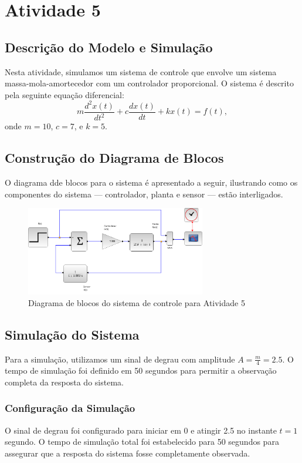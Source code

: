\section{Atividade 5}

\subsection{Descrição do Modelo e Simulação}
Nesta atividade, simulamos um sistema de controle que envolve um sistema massa-mola-amortecedor com um controlador proporcional. O sistema é descrito pela seguinte equação diferencial:
\[
    m\frac{d^2x(t)}{dt^2} + c\frac{dx(t)}{dt} + kx(t) = f(t),
\]
onde \( m = 10 \), \( c = 7 \), e \( k = 5 \).

\subsection{Construção do Diagrama de Blocos}
O diagrama dde blocos para o sistema é apresentado a seguir, ilustrando como os componentes do sistema — controlador, planta e sensor — estão interligados.

\begin{figure}[H]
    \centering
    \includegraphics[width=0.7\textwidth]{atividades/5-atividade/assets/diagrama-a.png}
    \caption{Diagrama de blocos do sistema de controle para Atividade 5}
    \label{fig:diagrama_blocos_5}
\end{figure}

\subsection{Simulação do Sistema}
Para a simulação, utilizamos um sinal de degrau com amplitude \( A = \frac{m}{4} = 2.5 \). O tempo de simulação foi definido em 50 segundos para permitir a observação completa da resposta do sistema.

\subsubsection{Configuração da Simulação}
O sinal de degrau foi configurado para iniciar em 0 e atingir 2.5 no instante \( t = 1 \) segundo. O tempo de simulação total foi estabelecido para 50 segundos para assegurar que a resposta do sistema fosse completamente observada.


